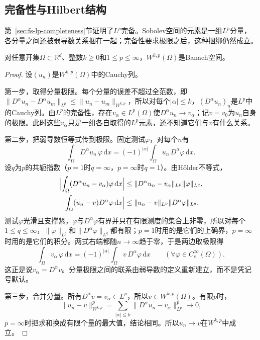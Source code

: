 \subsection{完备性与Hilbert结构}
\label{sec:sob-completeness}

第~\ref{sec:fs-lp-completeness}节证明了$L^p$完备。Sobolev空间的元素是一组$L^p$分量，各分量之间还被弱导数关系捆在一起；完备性要求极限之后，这种捆绑仍然成立。

\begin{theorem}[Sobolev空间的完备性]
\label{thm:sob-complete}
对任意开集$\Omega\subset\mathbb R^d$、整数$k\ge0$和$1\le p\le\infty$，$W^{k,p}(\Omega)$是Banach空间。
\end{theorem}

\begin{proof}
设$(u_n)$是$W^{k,p}(\Omega)$中的Cauchy列。

第一步，取得分量极限。每个分量的误差不超过全范数，即$\|D^\alpha u_n-D^\alpha u_m\|_{L^p}\le\|u_n-u_m\|_{W^{k,p}}$，所以对每个$|\alpha|\le k$，$(D^\alpha u_n)_n$是$L^p$中的Cauchy列。由$L^p$的完备性，存在$v_\alpha\in L^p(\Omega)$使$D^\alpha u_n\to v_\alpha$；记$v=v_0$为$u_n$自身的极限。此时这些$v_\alpha$只是一组各自取得的$L^p$元素，还不知道它们与$v$有什么关系。

第二步，把弱导数恒等式传到极限。固定测试$\varphi$，对每个$n$有
\[
 \int_\Omega D^\alpha u_n\,\varphi\,\mathrm dx=(-1)^{|\alpha|}\int_\Omega u_n\,D^\alpha\varphi\,\mathrm dx .
\]
设$q$为$p$的共轭指数（$p=1$时$q=\infty$，$p=\infty$时$q=1$）。由Hölder不等式，
\[
 \begin{aligned}
 \Bigl|\int_\Omega(D^\alpha u_n-v_\alpha)\varphi\,\mathrm dx\Bigr|&\le\|D^\alpha u_n-v_\alpha\|_{L^p}\|\varphi\|_{L^q},\\
 \Bigl|\int_\Omega(u_n-v)D^\alpha\varphi\,\mathrm dx\Bigr|&\le\|u_n-v\|_{L^p}\|D^\alpha\varphi\|_{L^q} .
 \end{aligned}
\]
测试$\varphi$光滑且支撑紧，$\varphi$与$D^\alpha\varphi$有界并只在有限测度的集合上非零，所以对每个$1\le q\le\infty$，$\|\varphi\|_{L^q}$和$\|D^\alpha\varphi\|_{L^q}$都有限；$p=1$时用的是它们的上确界，$p=\infty$时用的是它们的积分。两式右端都随$n\to\infty$趋于零，于是两边取极限得
\[
 \int_\Omega v_\alpha\,\varphi\,\mathrm dx=(-1)^{|\alpha|}\int_\Omega v\,D^\alpha\varphi\,\mathrm dx\qquad(\forall\varphi\in C_c^\infty(\Omega)).
\]
这正是说$v_\alpha=D^\alpha v$。分量极限之间的联系由弱导数的定义重新建立，而不是凭记号默认。

第三步，合并分量。所有$D^\alpha v=v_\alpha\in L^p$，所以$v\in W^{k,p}(\Omega)$。有限$p$时，
\[
 \|u_n-v\|_{W^{k,p}}^p=\sum_{|\alpha|\le k}\|D^\alpha u_n-v_\alpha\|_{L^p}^p\longrightarrow0 ,
\]
$p=\infty$时把求和换成有限个量的最大值，结论相同。所以$u_n\to v$在$W^{k,p}$中成立。
\end{proof}

